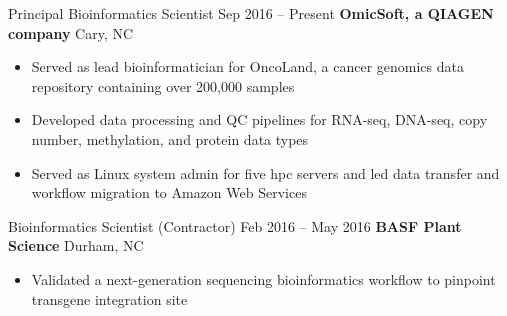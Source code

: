 
\begin{resentries}

  \resentrybeta
    {Principal Bioinformatics Scientist}
    {Sep 2016 -- Present}
    {\textbf{OmicSoft, a QIAGEN company}} %
    {Cary, NC} %
    {
      \begin{itemize}[leftmargin=*, itemsep=-1.5mm] %
        \item{Served as lead bioinformatician for OncoLand, a cancer genomics data repository containing over 200,000 samples}
        \item{Developed data processing and QC pipelines for RNA-seq, DNA-seq, copy number, methylation, and protein data types} 
        \item{Served as Linux system admin for five hpc servers and led data transfer and workflow migration to Amazon Web Services}
      \end{itemize}
    }

  \resentrybeta
    {Bioinformatics Scientist (Contractor)}
    {Feb 2016 -- May 2016}
    {\textbf{BASF Plant Science}}
    {Durham, NC}
    {
      \begin{itemize}[leftmargin=*, itemsep=-1.5mm] %
        \item{Validated a next-generation sequencing bioinformatics workflow to pinpoint transgene integration site}
      \end{itemize}
    }

\end{resentries}
